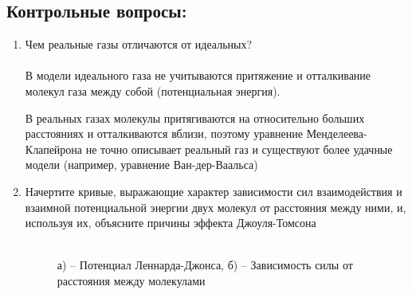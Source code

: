 \documentclass[a4paper,12pt]{article} %
\begin{document}
\subsection{Контрольные вопросы:}
\begin{enumerate}
\itemsep0em
\item Чем реальные газы отличаются от идеальных? \\ \\
В модели идеального газа не учитываются притяжение и отталкивание молекул газа между собой (потенциальная энергия). 

В реальных газах молекулы притягиваются на относительно больших расстояниях и отталкиваются вблизи, поэтому уравнение Менделеева-Клапейрона не точно описывает реальный газ и существуют более удачные модели (например, уравнение Ван-дер-Ваальса)

\item Начертите кривые, выражающие характер зависимости сил взаимодействия и взаимной потенциальной энергии двух молекул от расстояния между ними, и, используя их, объясните причины эффекта Джоуля-Томсона\\ \\
\begin{figure}
\begin{minipage}[h]{0.49\linewidth}
\end{minipage}
\hfill
\begin{minipage}[h]{0.49\linewidth}
\end{minipage}
\caption{а) -- Потенциал Леннарда-Джонса, б) -- Зависимость силы от расстояния между молекулами}
\label{ris:image1}
\end{figure}


\end{enumerate}
\end{document}
